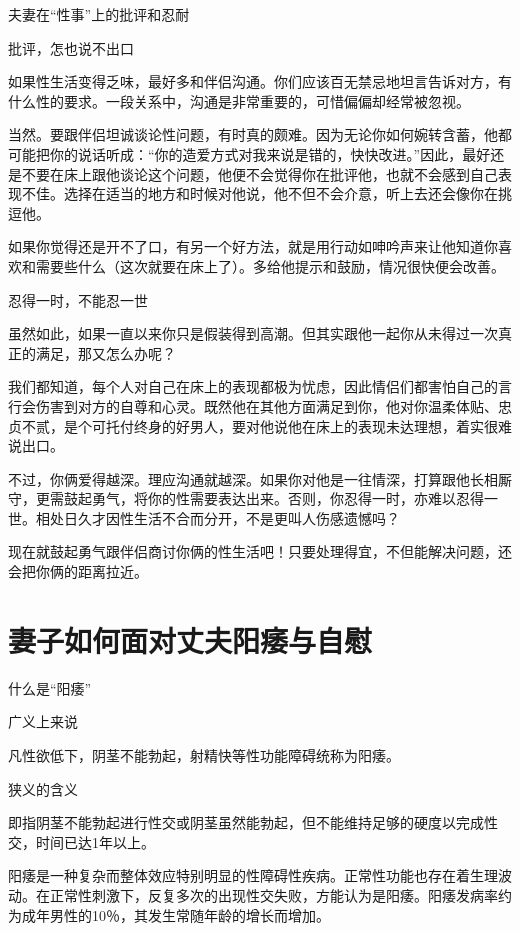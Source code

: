 \documentclass[12pt,UTF8,openany]{ctexbook}
\begin{document}
夫妻在“性事”上的批评和忍耐


批评，怎也说不出口

如果性生活变得乏味，最好多和伴侣沟通。你们应该百无禁忌地坦言告诉对方，有什么性的要求。一段关系中，沟通是非常重要的，可惜偏偏却经常被忽视。

当然。要跟伴侣坦诚谈论性问题，有时真的颇难。因为无论你如何婉转含蓄，他都可能把你的说话听成：“你的造爱方式对我来说是错的，快快改进。”因此，最好还是不要在床上跟他谈论这个问题，他便不会觉得你在批评他，也就不会感到自己表现不佳。选择在适当的地方和时候对他说，他不但不会介意，听上去还会像你在挑逗他。

如果你觉得还是开不了口，有另一个好方法，就是用行动如呻吟声来让他知道你喜欢和需要些什么（这次就要在床上了）。多给他提示和鼓励，情况很快便会改善。

忍得一时，不能忍一世

虽然如此，如果一直以来你只是假装得到高潮。但其实跟他一起你从未得过一次真正的满足，那又怎么办呢？

我们都知道，每个人对自己在床上的表现都极为忧虑，因此情侣们都害怕自己的言行会伤害到对方的自尊和心灵。既然他在其他方面满足到你，他对你温柔体贴、忠贞不贰，是个可托付终身的好男人，要对他说他在床上的表现未达理想，着实很难说出口。

不过，你俩爱得越深。理应沟通就越深。如果你对他是一往情深，打算跟他长相厮守，更需鼓起勇气，将你的性需要表达出来。否则，你忍得一时，亦难以忍得一世。相处日久才因性生活不合而分开，不是更叫人伤感遗憾吗？

现在就鼓起勇气跟伴侣商讨你俩的性生活吧！只要处理得宜，不但能解决问题，还会把你俩的距离拉近。





\chapter{妻子如何面对丈夫阳痿与自慰}


什么是“阳痿”


广义上来说

凡性欲低下，阴茎不能勃起，射精快等性功能障碍统称为阳痿。

狭义的含义

即指阴茎不能勃起进行性交或阴茎虽然能勃起，但不能维持足够的硬度以完成性交，时间已达1年以上。

阳痿是一种复杂而整体效应特别明显的性障碍性疾病。正常性功能也存在着生理波动。在正常性刺激下，反复多次的出现性交失败，方能认为是阳痿。阳痿发病率约为成年男性的10％，其发生常随年龄的增长而增加。
\end{document}
